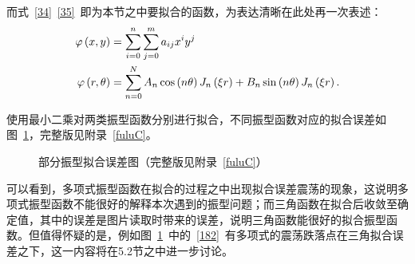 \documentclass[withoutpreface,bwprint]{cumcmthesis} %
\begin{document}
而式~\eqref{34}~\eqref{35}~即为本节之中要拟合的函数，为表达清晰在此处再一次表述：
\begin{equation}
    \begin{aligned}
     \varphi\left(x,y\right)&=\sum_{i=0}^n\sum_{j=0}^ma_{ij}x^iy^j\\
\varphi\left(r,\theta\right)&=\sum_{n=0}^N A_n \cos\left(n\theta\right)J_n\left(\xi r\right)+B_n\sin\left(n\theta\right)J_n\left(\xi r\right).   \notag
    \end{aligned}
\end{equation}

使用最小二乘对两类振型函数分别进行拟合，不同振型函数对应的拟合误差如图~\ref{82wucha}，完整版见附录~\ref{fuluC}。
\begin{figure}[htbp]
\centering
{}
\hfil
{}
\hfil
\caption{部分振型拟合误差图（完整版见附录~\ref{fuluC}）}
\label{fig_4.3.1}
\vspace{-0.4cm} \label{82wucha}
\end{figure}

可以看到，多项式振型函数在拟合的过程之中出现拟合误差震荡的现象，这说明多项式振型函数不能很好的解释本次遇到的振型问题；而三角函数在拟合后收敛至确定值，其中的误差是图片读取时带来的误差，说明三角函数能很好的拟合振型函数。但值得怀疑的是，例如图~\ref{82wucha}~中的~\ref{182}~有多项式的震荡跌落点在三角拟合误差之下，这一内容将在5.2节之中进一步讨论。
\end{document}
